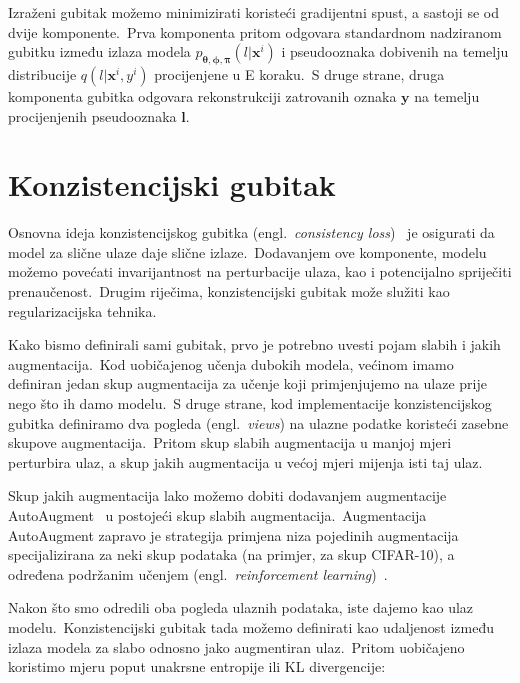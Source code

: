 \documentclass[diplomskirad]{fer}
\begin{document}
Izraženi gubitak možemo minimizirati koristeći gradijentni spust, a sastoji se od dvije komponente.\ 
Prva komponenta pritom odgovara standardnom nadziranom gubitku između izlaza modela $p_{\bm{\theta}, \bm{\phi}, \bm{\pi}}(l | \bm{x}^i)$ i pseudooznaka dobivenih na temelju distribucije $q(l | \bm{x}^i, y^i)$ procijenjene u E koraku.\ 
S druge strane, druga komponenta gubitka odgovara rekonstrukciji zatrovanih oznaka $\bm{y}$ na temelju procijenjenih pseudooznaka $\bm{l}$.\ 

\section{Konzistencijski gubitak}
\label{sek:con_loss}

Osnovna ideja konzistencijskog gubitka (engl.\ \textit{consistency loss})~\cite{berthelot2019mixmatch} je osigurati da model za slične ulaze daje slične izlaze.\ 
Dodavanjem ove komponente, modelu možemo povećati invarijantnost na perturbacije ulaza, kao i potencijalno spriječiti prenaučenost.\ 
Drugim riječima, konzistencijski gubitak može služiti kao regularizacijska tehnika.\ 

Kako bismo definirali sami gubitak, prvo je potrebno uvesti pojam slabih i jakih augmentacija.\ 
Kod uobičajenog učenja dubokih modela, većinom imamo definiran jedan skup augmentacija za učenje koji primjenjujemo na ulaze prije nego što ih damo modelu.\ 
S druge strane, kod implementacije konzistencijskog gubitka definiramo dva pogleda (engl.\ \textit{views}) na ulazne podatke koristeći zasebne skupove augmentacija.\ 
Pritom skup slabih augmentacija u manjoj mjeri perturbira ulaz, a skup jakih augmentacija u većoj mjeri mijenja isti taj ulaz.\ 

Skup jakih augmentacija lako možemo dobiti dodavanjem augmentacije AutoAugment~\cite{cubuk2019autoaugment} u postojeći skup slabih augmentacija.\
Augmentacija AutoAugment zapravo je strategija primjena niza pojedinih augmentacija specijalizirana za neki skup podataka (na primjer, za skup CIFAR-10), a određena podržanim učenjem (engl.\ \textit{reinforcement learning})~\cite{kaelbling1996reinforcement}.\ 

\pagebreak

Nakon što smo odredili oba pogleda ulaznih podataka, iste dajemo kao ulaz modelu.\ Konzistencijski gubitak tada možemo definirati kao udaljenost između izlaza modela za slabo odnosno jako augmentiran ulaz.\ Pritom uobičajeno koristimo mjeru poput unakrsne entropije ili KL divergencije:
\end{document}
